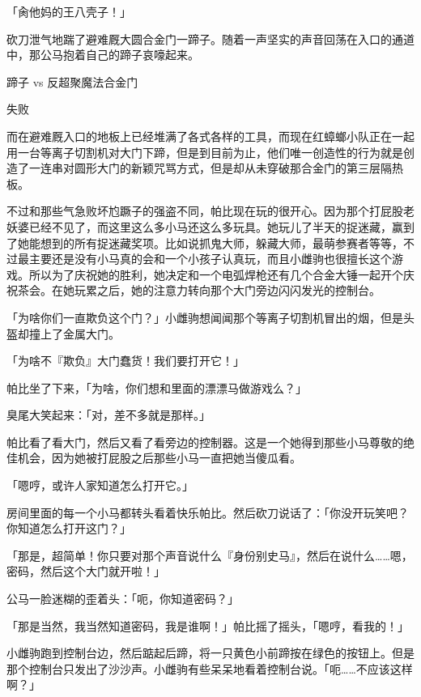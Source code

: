 \horizonline


「肏他妈的王八壳子！」

砍刀泄气地踹了避难厩大圆合金门一蹄子。随着一声坚实的声音回荡在入口的通道中，那公马抱着自己的蹄子哀嚎起来。

\begin{center}
    蹄子 vs 反超聚魔法合金门

    失败
\end{center}

而在避难厩入口的地板上已经堆满了各式各样的工具，而现在红蟑螂小队正在一起用一台等离子切割机对大门下蹄，但是到目前为止，他们唯一创造性的行为就是创造了一连串对圆形大门的新颖咒骂方式，但是却从未穿破那合金门的第三层隔热板。

不过和那些气急败坏尥蹶子的强盗不同，帕比现在玩的很开心。因为那个打屁股老妖婆已经不见了，而这里这么多小马还这么多玩具。她玩儿了半天的捉迷藏，赢到了她能想到的所有捉迷藏奖项。比如说抓鬼大师，躲藏大师，最萌参赛者等等，不过最主要还是没有小马真的会和一个小孩子认真玩，而且小雌驹也很擅长这个游戏。所以为了庆祝她的胜利，她决定和一个电弧焊枪还有几个合金大锤一起开个庆祝茶会。在她玩累之后，她的注意力转向那个大门旁边闪闪发光的控制台。

「为啥你们一直欺负这个门？」小雌驹想闻闻那个等离子切割机冒出的烟，但是头盔却撞上了金属大门。

「为啥不『欺负』大门蠢货！我们要打开它！」

帕比坐了下来，「为啥，你们想和里面的漂漂马做游戏么？」

臭尾大笑起来：「对，差不多就是那样。」

帕比看了看大门，然后又看了看旁边的控制器。这是一个她得到那些小马尊敬的绝佳机会，因为她被打屁股之后那些小马一直把她当傻瓜看。

「嗯哼，或许人家知道怎么打开它。」

房间里面的每一个小马都转头看着快乐帕比。然后砍刀说话了：「你没开玩笑吧？你知道怎么打开这门？」

「那是，超简单！你只要对那个声音说什么『身份别史马』，然后在说什么……嗯，密码，然后这个大门就开啦！」

公马一脸迷糊的歪着头：「呃，你知道密码？」

「那是当然，我当然知道密码，我是谁啊！」帕比摇了摇头，「嗯哼，看我的！」

小雌驹跑到控制台边，然后踮起后蹄，将一只黄色小前蹄按在绿色的按钮上。但是那个控制台只发出了沙沙声。小雌驹有些呆呆地看着控制台说。「呃……不应该这样啊？」

